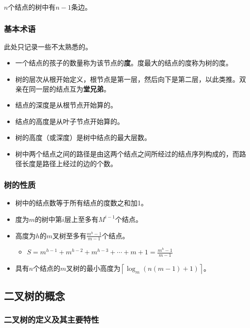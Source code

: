 \documentclass[12pt, a4paper, oneside]{ctexart}
\begin{document}
$n$个结点的树中有$n-1$条边。

\subsubsection{基本术语}

此处只记录一些不太熟悉的。

\begin{itemize}
  \item 一个结点的孩子的数量称为该节点的\textbf{度}。度最大的结点的度称为树的度。
  \item 树的层次从根开始定义，根节点是第一层，然后向下是第二层，以此类推。双亲在同一层的结点互为\textbf{堂兄弟}。
  \item 结点的深度是从根节点开始算的。
  \item 结点的高度是从叶子节点开始算的。
  \item 树的高度（或深度）是树中结点的最大层数。
  \item 树中两个结点之间的路径是由这两个结点之间所经过的结点序列构成的，而路径长度是路径上经过的边的个数。
\end{itemize}

\subsubsection{树的性质}

\begin{itemize}
  \item 树中的结点数等于所有结点的度数之和加1。
  \item 度为$m$的树中第$i$层上至多有$M^{i-1}$个结点。
  \item 高度为$h$的$m$叉树至多有$\frac{m^h-1}{m-1}$个结点。
  \begin{itemize}
    \item $S=m^{h-1}+m^{h-2}+m^{h-3}+\cdots +m+1=\frac{m^h-1}{m-1}$
  \end{itemize}
  \item 具有$n$个结点的$m$叉树的最小高度为$\left\lceil \log_m(n(m-1)+1)\right\rceil $。
\end{itemize}

\subsection{二叉树的概念}

\subsubsection{二叉树的定义及其主要特性}
\end{document}
